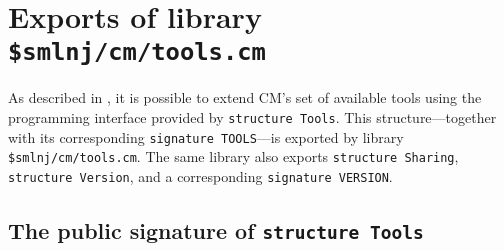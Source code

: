 %
\chapter{Exports of library \texttt{\$smlnj/cm/tools.cm}}

As described in , it is possible to extend
CM's set of available tools using the programming interface provided
by {\tt structure Tools}.  This structure---together with its
corresponding {\tt signature TOOLS}---is exported by library {\tt
\$smlnj/cm/tools.cm}.  The same library also exports {\tt structure
Sharing}, {\tt structure Version}, and a corresponding {\tt signature
VERSION}.

\section{The public signature of {\tt structure Tools}}

